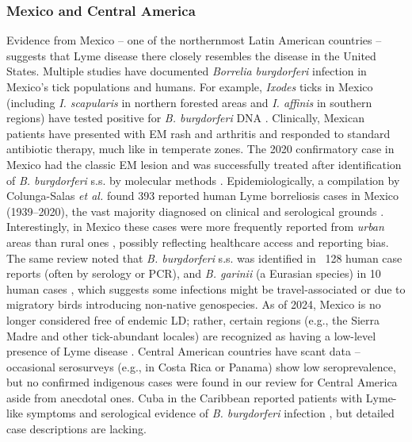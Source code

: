 \documentclass[11pt,letterpaper]{article}
\begin{document}
\subsubsection{Mexico and Central America}
Evidence from Mexico – one of the northernmost Latin American countries – suggests that Lyme disease there closely resembles the disease in the United States. Multiple studies have documented \textit{Borrelia burgdorferi} infection in Mexico's tick populations and humans. For example, \textit{Ixodes} ticks in Mexico (including \textit{I. scapularis} in northern forested areas and \textit{I. affinis} in southern regions) have tested positive for \textit{B. burgdorferi} DNA \citep{Lucca2024j}. Clinically, Mexican patients have presented with EM rash and arthritis and responded to standard antibiotic therapy, much like in temperate zones. The 2020 confirmatory case in Mexico had the classic EM lesion and was successfully treated after identification of \textit{B. burgdorferi} s.s. by molecular methods \citep{Colunga-Salas2020f}. Epidemiologically, a compilation by Colunga-Salas \textit{et al.} found 393 reported human Lyme borreliosis cases in Mexico (1939–2020), the vast majority diagnosed on clinical and serological grounds \citep{Colunga-Salas2020g}. Interestingly, in Mexico these cases were more frequently reported from \textit{urban} areas than rural ones \citep{Colunga-Salas2020h}, possibly reflecting healthcare access and reporting bias. The same review noted that \textit{B. burgdorferi} s.s. was identified in ~128 human case reports (often by serology or PCR), and \textit{B. garinii} (a Eurasian species) in 10 human cases \citep{Colunga-Salas2020i}, which suggests some infections might be travel-associated or due to migratory birds introducing non-native genospecies. As of 2024, Mexico is no longer considered free of endemic LD; rather, certain regions (e.g., the Sierra Madre and other tick-abundant locales) are recognized as having a low-level presence of Lyme disease \citep{Colunga-Salas2020j, Colunga-Salas2020k}. Central American countries have scant data – occasional serosurveys (e.g., in Costa Rica or Panama) show low seroprevalence, but no confirmed indigenous cases were found in our review for Central America aside from anecdotal ones. Cuba in the Caribbean reported patients with Lyme-like symptoms and serological evidence of \textit{B. burgdorferi} infection \citep{Lucca2024k}, but detailed case descriptions are lacking.
\end{document}

